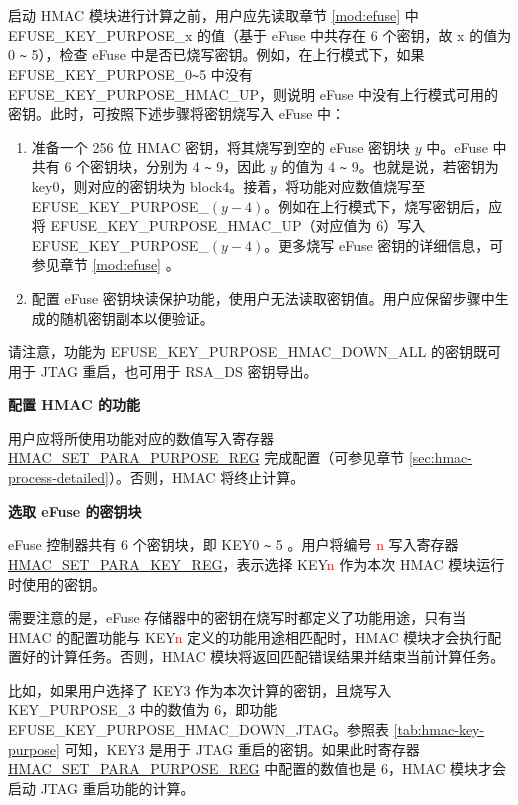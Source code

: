 \documentclass[main\_\_CN.tex]{subfiles}
\begin{document}
启动 HMAC 模块进行计算之前，用户应先读取章节 \ref{mod:efuse} \textit{} 中 EFUSE\_KEY\_PURPOSE\_x 的值（基于 eFuse 中共存在 6 个密钥，故 x 的值为 0 \verb+~+ 5），检查 eFuse 中是否已烧写密钥。例如，在上行模式下，如果 EFUSE\_KEY\_PURPOSE\_0\verb+~+5 中没有 EFUSE\_KEY\_PURPOSE\_HMAC\_UP，则说明 eFuse 中没有上行模式可用的密钥。此时，可按照下述步骤将密钥烧写入 eFuse 中：

\begin{enumerate}
    \item 准备一个 256 位 HMAC 密钥，将其烧写到空的 eFuse 密钥块 $y$ 中。eFuse 中共有 6 个密钥块，分别为 4 \verb+~+ 9，因此 $y$ 的值为 4 \verb+~+ 9。也就是说，若密钥为 key0，则对应的密钥块为 block4。接着，将功能对应数值烧写至\\ EFUSE\_KEY\_PURPOSE\_$(y-4)$。例如在上行模式下，烧写密钥后，应将 EFUSE\_KEY\_PURPOSE\_HMAC\_UP（对应值为 6）写入 EFUSE\_KEY\_PURPOSE\_$(y-4)$。更多烧写 eFuse 密钥的详细信息，可参见章节 \ref{mod:efuse} \textit{}。
    \item 配置 eFuse 密钥块读保护功能，使用户无法读取密钥值。用户应保留步骤中生成的随机密钥副本以便验证。
\end{enumerate}

请注意，功能为 EFUSE\_KEY\_PURPOSE\_HMAC\_DOWN\_ALL 的密钥既可用于 JTAG 重启，也可用于 RSA\_DS 密钥导出。




\textbf{配置 HMAC 的功能}

用户应将所使用功能对应的数值写入寄存器 \hyperref[regdesc:HMACSETPARAPURPOSEREG]{HMAC\_SET\_PARA\_PURPOSE\_REG} 完成配置（可参见章节 \ref{sec:hmac-process-detailed}）。否则，HMAC 将终止计算。

\textbf{选取 eFuse 的密钥块}
\label{sec:hmac-config-efuse-key}

eFuse 控制器共有 6 个密钥块，即 KEY0 \verb+~+ 5 。用户将编号 \textcolor{red}{n} 写入寄存器 \hyperref[regdesc:HMACSETPARAKEYREG]{HMAC\_SET\_PARA\_KEY\_REG}，表示选择 KEY\textcolor{red}{n} 作为本次 HMAC 模块运行时使用的密钥。

需要注意的是，eFuse 存储器中的密钥在烧写时都定义了功能用途，只有当 HMAC 的配置功能与 KEY\textcolor{red}{n} 定义的功能用途相匹配时，HMAC 模块才会执行配置好的计算任务。否则，HMAC 模块将返回匹配错误结果并结束当前计算任务。

比如，如果用户选择了 KEY3 作为本次计算的密钥，且烧写入 KEY\_PURPOSE\_3 中的数值为 6，即功能 EFUSE\_KEY\_PURPOSE\_HMAC\_DOWN\_JTAG。参照表 \ref{tab:hmac-key-purpose} 可知，KEY3 是用于 JTAG 重启的密钥。如果此时寄存器 \hyperref[regdesc:HMACSETPARAPURPOSEREG]{HMAC\_SET\_PARA\_PURPOSE\_REG} 中配置的数值也是 6，HMAC 模块才会启动 JTAG 重启功能的计算。
\end{document}
